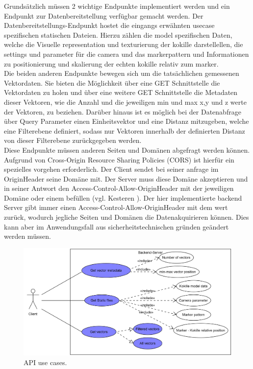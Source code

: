 Grundsätzlich müssen 2 wichtige Endpunkte implementiert werden und ein Endpunkt zur Datenbereitstellung verfügbar gemacht werden.
Der Datenbereitstellungs-Endpunkt hostet die eingangs erwähnten usecase spezifischen statischen Dateien. Hierzu zählen die model spezifischen Daten, welche die Visuelle representation und texturierung der kokille darstellellen, die settings und parameter für die camera und das markerpattern und Informationen zu positionierung und skalierung der echten kokille relativ zum marker.\\
Die beiden anderen Endpunkte bewegen sich um die tatsächlichen gemessenen Vektordaten. Sie bieten die Möglichkeit über eine GET Schnittstelle die Vektordaten zu holen und über eine weitere GET Schnittstelle die Metadaten dieser Vektoren, wie die Anzahl und die jeweiligen min und max x,y und z werte der Vektoren, zu beziehen. Darüber hinaus ist es möglich bei der Datenabfrage über Query Parameter einen Einheitsvektor und eine Distanz mitzugeben, welche eine Filterebene definiert, sodass nur Vektoren innerhalb der definierten Distanz von dieser Filterebene zurückgegeben werden.\\
Diese Endpunkte müssen anderen Seiten und Domänen abgefragt werden können. Aufgrund von Cross-Origin Resource Sharing Policies (CORS) ist hierfür ein spezielles vorgehen erforderlich. Der Client sendet bei seiner anfrage im \grqq Origin\grqq\space Header seine Domäne mit. Der Server muss diese Domäne akzeptieren und in seiner Antwort den \grqq Access-Control-Allow-Origin\grqq\space Header mit der jeweiligen Domäne oder einem \grqq *\grqq\space befüllen (vgl. Kesteren \cite{van2014cross}). Der hier implementierte backend Server gibt immer einen \grqq Access-Control-Allow-Origin\grqq\space Header mit dem wert \grqq *\grqq\space zurück, wodurch jegliche Seiten und Domänen die Datenakquirieren können. Dies kann aber im Anwendungsfall aus sicherheitstechnischen gründen geändert werden müssen.

\begin{figure}
	\centering
	\includegraphics[width=1\linewidth]{images/backend/APIUseCases}
	\caption{API use cases.}
	\label{fig:backendUseCase}
\end{figure}


